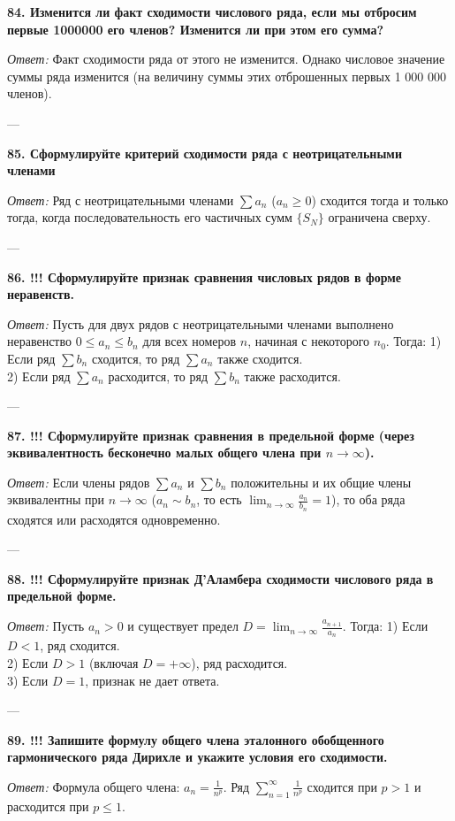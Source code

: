 \documentclass{article}
\begin{document}
\textbf{84. Изменится ли факт сходимости числового ряда, если мы отбросим первые 1000000 его членов? Изменится ли при этом его сумма?}

\textit{Ответ:} Факт сходимости ряда от этого не изменится. Однако числовое значение суммы ряда изменится (на величину суммы этих отброшенных первых 1 000 000 членов).

---

\textbf{85. Сформулируйте критерий сходимости ряда с неотрицательными членами}

\textit{Ответ:} Ряд с неотрицательными членами $\sum a_n$ ($a_n \ge 0$) сходится тогда и только тогда, когда последовательность его частичных сумм $\{S_N\}$ ограничена сверху.

---

\textbf{86. !!! Сформулируйте признак сравнения числовых рядов в форме неравенств.}

\textit{Ответ:} Пусть для двух рядов с неотрицательными членами выполнено неравенство $0 \le a_n \le b_n$ для всех номеров $n$, начиная с некоторого $n_0$. Тогда:
1) Если ряд $\sum b_n$ сходится, то ряд $\sum a_n$ также сходится. \\
2) Если ряд $\sum a_n$ расходится, то ряд $\sum b_n$ также расходится.

---

\textbf{87. !!! Сформулируйте признак сравнения в предельной форме (через эквивалентность бесконечно малых общего члена при $n\rightarrow\infty$).}

\textit{Ответ:} Если члены рядов $\sum a_n$ и $\sum b_n$ положительны и их общие члены эквивалентны при $n \to \infty$ ($a_n \sim b_n$, то есть $\lim_{n \to \infty} \frac{a_n}{b_n} = 1$), то оба ряда сходятся или расходятся одновременно.

---

\textbf{88. !!! Сформулируйте признак Д'Аламбера сходимости числового ряда в предельной форме.}

\textit{Ответ:} Пусть $a_n > 0$ и существует предел $D = \lim_{n \to \infty} \frac{a_{n+1}}{a_n}$. Тогда:
1) Если $D < 1$, ряд сходится. \\
2) Если $D > 1$ (включая $D = +\infty$), ряд расходится. \\
3) Если $D = 1$, признак не дает ответа.

---

\textbf{89. !!! Запишите формулу общего члена эталонного обобщенного гармонического ряда Дирихле и укажите условия его сходимости.}

\textit{Ответ:} Формула общего члена: $a_n = \frac{1}{n^p}$. Ряд $\sum_{n=1}^{\infty} \frac{1}{n^p}$ сходится при $p > 1$ и расходится при $p \le 1$.
\end{document}
